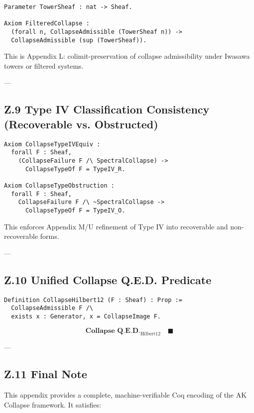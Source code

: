 \documentclass[11pt]{article}
\begin{document}
\begin{lstlisting}[language=Coq, caption={Towerwise Collapse Stability (IW$_1$)}]
Parameter TowerSheaf : nat -> Sheaf.

Axiom FilteredCollapse :
  (forall n, CollapseAdmissible (TowerSheaf n)) ->
  CollapseAdmissible (sup (TowerSheaf)).
\end{lstlisting}

This is Appendix L: colimit-preservation of collapse admissibility under Iwasawa towers or filtered systems.

---

\subsection*{Z.9 Type IV Classification Consistency (Recoverable vs. Obstructed)}

\begin{lstlisting}[language=Coq, caption={Type IV Split Equivalence}]
Axiom CollapseTypeIVEquiv :
  forall F : Sheaf,
    (CollapseFailure F /\ SpectralCollapse) ->
      CollapseTypeOf F = TypeIV_R.

Axiom CollapseTypeObstruction :
  forall F : Sheaf,
    CollapseFailure F /\ ~SpectralCollapse ->
      CollapseTypeOf F = TypeIV_O.
\end{lstlisting}

This enforces Appendix M/U refinement of Type IV into recoverable and non-recoverable forms.

---

\subsection*{Z.10 Unified Collapse Q.E.D. Predicate}

\begin{lstlisting}[language=Coq, caption={CollapseHilbert12 Predicate}]
Definition CollapseHilbert12 (F : Sheaf) : Prop :=
  CollapseAdmissible F /\
  exists x : Generator, x = CollapseImage F.
\end{lstlisting}

\[
\textbf{Collapse Q.E.D.}_{\text{Hilbert12}} \quad \blacksquare
\]

---

\subsection*{Z.11 Final Note}

This appendix provides a complete, machine-verifiable Coq encoding of the AK Collapse framework.  
It satisfies:
\end{document}
